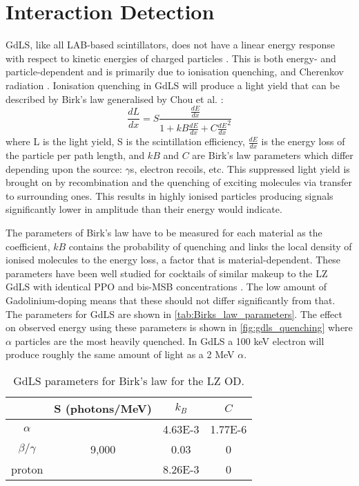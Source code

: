 \section{Interaction Detection}
\label{sec:od_physics}
\par
GdLS, like all LAB-based scintillators, does not have a linear energy response with respect to kinetic energies of charged particles \cite{nonlinear_gdls_ref}.
This is both energy- and particle-dependent and is primarily due to ionisation quenching, and Cherenkov radiation \cite{lab_quenching_theory_ref}.
Ionisation quenching in GdLS will produce a light yield that can be described by Birk's law \cite{birks_law_ref} generalised by Chou et al. \cite{generalised_birks_ref}:
\begin{equation} 
    \frac{dL}{dx} = S \frac{\frac{dE}{dx}}{1 + kB\frac{dE}{dx} + C\frac{dE}{dx}^2}
    \label{eq:birkslaw}
\end{equation}
where L is the light yield, S is the scintillation efficiency, $\frac{dE}{dx}$ is the energy loss of the particle per path length, and $kB$ and $C$ are Birk's law parameters which differ depending upon the source: $\gamma$s, electron recoils, etc.
This suppressed light yield is brought on by recombination and the quenching of exciting molecules via transfer to surrounding ones.
This results in highly ionised particles producing signals significantly lower in amplitude than their energy would indicate.

\par
The parameters of Birk's law have to be measured for each material as the coefficient, $kB$ contains the probability of quenching and links the local density of ionised molecules to the energy loss, a factor that is material-dependent. 
These parameters have been well studied for cocktails of similar makeup to the LZ GdLS with identical PPO and bis-MSB concentrations \cite{ls_alpha_quenching_ref,ls_proton_quenching_ref}.
The low amount of Gadolinium-doping means that these should not differ significantly from that.
The parameters for GdLS are shown in \autoref{tab:Birks_law_parameters}.
The effect on observed energy using these parameters is shown in \autoref{fig:gdls_quenching} where $\alpha$ particles are the most heavily quenched.
In GdLS a 100 keV electron will produce roughly the same amount of light as a 2 MeV $\alpha$.

\begin{table}[]
    \centering
    \begin{tabular}{c | c | c | c }
                   & S (photons/MeV) & $k_{B}$ & $C$ \\ \hline
    $\alpha$       &                 & 4.63E-3 & 1.77E-6 \\
    $\beta/\gamma$ & 9,000           & 0.03    & 0 \\ 
    proton         &                 & 8.26E-3 & 0
    \end{tabular}
    \caption{GdLS parameters for Birk's law for the LZ OD.}
    \label{tab:Birks_law_parameters}
\end{table} 

